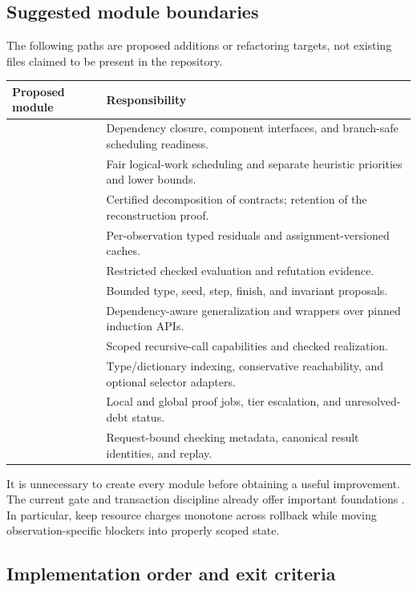 \documentclass[11pt,a4paper]{article}
\theoremstyle{definition}
\theoremstyle{remark}
\begin{document}
\subsection{Suggested module boundaries}
The following paths are proposed additions or refactoring targets, not existing
files claimed to be present in the repository.
\begin{longtable}{@{}L{54mm}L{88mm}@{}}
\toprule Proposed module & Responsibility\\\midrule
\endhead
{} & Dependency closure, component interfaces, and branch-safe scheduling readiness.\\
 & Fair logical-work scheduling and separate heuristic priorities and lower bounds.\\
 & Certified decomposition of contracts; retention of the reconstruction proof.\\
 & Per-observation typed residuals and assignment-versioned caches.\\
 & Restricted checked evaluation and refutation evidence.\\
 & Bounded type, seed, step, finish, and invariant proposals.\\
 & Dependency-aware generalization and wrappers over pinned induction APIs.\\
 & Scoped recursive-call capabilities and checked realization.\\
 & Type/dictionary indexing, conservative reachability, and optional selector adapters.\\
 & Local and global proof jobs, tier escalation, and unresolved-debt status.\\
 & Request-bound checking metadata, canonical result identities, and replay.\\
\bottomrule
\end{longtable}

It is unnecessary to create every module before obtaining a useful improvement.
The current gate and transaction discipline already offer important foundations
\cite{srcgate,srctrans}. In particular, keep resource charges monotone across
rollback while moving observation-specific blockers into properly scoped state.

\subsection{Implementation order and exit criteria}
\end{document}
